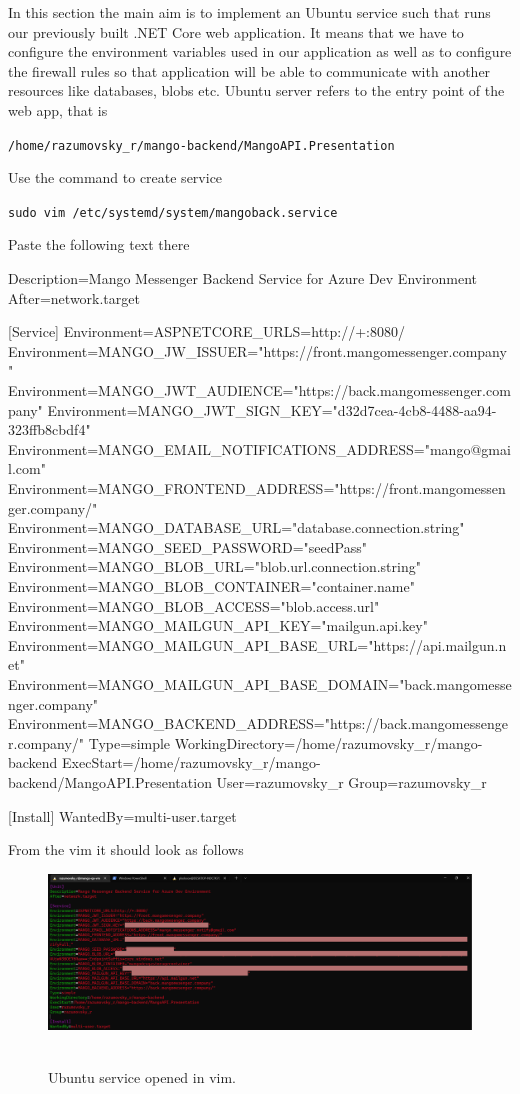 In this section the main aim is to implement an Ubuntu service such that runs our previously built
.NET Core web application.
It means that we have to configure the environment variables used in our application
as well as to configure the firewall rules so that application will be able to communicate with
another resources like databases, blobs etc.
Ubuntu server refers to the entry point of the web app, that is
\begin{center}
    \texttt{/home/razumovsky\_r/mango-backend/MangoAPI.Presentation}
\end{center}
Use the command to create service
\begin{center}
    \texttt{sudo vim /etc/systemd/system/mangoback.service}
\end{center}
Paste the following text there
\begin{spverbatim}
    [Unit]
    Description=Mango Messenger Backend Service for Azure Dev Environment
    After=network.target

    [Service]
    Environment=ASPNETCORE_URLS=http://+:8080/
    Environment=MANGO_JW_ISSUER="https://front.mangomessenger.company"
    Environment=MANGO_JWT_AUDIENCE="https://back.mangomessenger.company"
    Environment=MANGO_JWT_SIGN_KEY="d32d7cea-4cb8-4488-aa94-323ffb8cbdf4"
    Environment=MANGO_EMAIL_NOTIFICATIONS_ADDRESS="mango@gmail.com"
    Environment=MANGO_FRONTEND_ADDRESS="https://front.mangomessenger.company/"
    Environment=MANGO_DATABASE_URL="database.connection.string"
    Environment=MANGO_SEED_PASSWORD="seedPass"
    Environment=MANGO_BLOB_URL="blob.url.connection.string"
    Environment=MANGO_BLOB_CONTAINER="container.name"
    Environment=MANGO_BLOB_ACCESS="blob.access.url"
    Environment=MANGO_MAILGUN_API_KEY="mailgun.api.key"
    Environment=MANGO_MAILGUN_API_BASE_URL="https://api.mailgun.net"
    Environment=MANGO_MAILGUN_API_BASE_DOMAIN="back.mangomessenger.company"
    Environment=MANGO_BACKEND_ADDRESS="https://back.mangomessenger.company/"
    Type=simple
    WorkingDirectory=/home/razumovsky_r/mango-backend
    ExecStart=/home/razumovsky_r/mango-backend/MangoAPI.Presentation
    User=razumovsky_r
    Group=razumovsky_r

    [Install]
    WantedBy=multi-user.target
\end{spverbatim}
From the vim it should look as follows~\cite{Ubuntu_service}
\begin{figure}[H]
    \centering
    \includegraphics[width=1\textwidth]{img/05_ubuntu_service_vim}
    ~\caption{Ubuntu service opened in vim.}\label{fig:figure13}
\end{figure}
